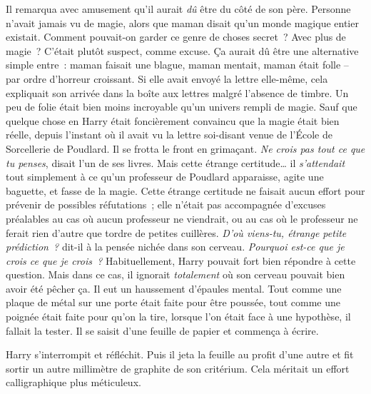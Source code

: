 Il remarqua avec amusement qu'il aurait \emph{dû} être du côté de son père. Personne n'avait jamais vu de magie, alors que maman disait qu'un monde magique entier existait. Comment pouvait-on garder ce genre de choses secret~? Avec plus de magie~? C'était plutôt suspect, comme excuse.
Ça aurait dû être une alternative simple entre~: maman faisait une blague, maman mentait, maman était folle -- par ordre d'horreur croissant. Si elle avait envoyé la lettre elle-même, cela expliquait son arrivée dans la boîte aux lettres malgré l'absence de timbre. Un peu de folie était bien moins incroyable qu'un univers rempli de magie.
Sauf que quelque chose en Harry était foncièrement convaincu que la magie était bien réelle, depuis l'instant où il avait vu la lettre soi-disant venue de l'École de Sorcellerie de Poudlard.
Il se frotta le front en grimaçant. \emph{Ne crois pas tout ce que tu penses}, disait l'un de ses livres.
Mais cette étrange certitude… il \emph{s'attendait} tout simplement à ce qu'un professeur de Poudlard apparaisse, agite une baguette, et fasse de la magie. Cette étrange certitude ne faisait aucun effort pour prévenir de possibles réfutations~; elle n'était pas accompagnée d'excuses préalables au cas où aucun professeur ne viendrait, ou au cas où le professeur ne ferait rien d'autre que tordre de petites cuillères.
\emph{D'où viens-tu, étrange petite prédiction~?} dit-il à la pensée nichée dans son cerveau. \emph{Pourquoi est-ce que je crois ce que je crois~?}
Habituellement, Harry pouvait fort bien répondre à cette question. Mais dans ce cas, il ignorait \emph{totalement} où son cerveau pouvait bien avoir été pêcher ça.
Il eut un haussement d'épaules mental. Tout comme une plaque de métal sur une porte était faite pour être poussée, tout comme une poignée était faite pour qu'on la tire, lorsque l'on était face à une hypothèse, il fallait la tester.
Il se saisit d'une feuille de papier et commença à écrire.
\begin{writtenNote}
\end{writtenNote}

Harry s'interrompit et réfléchit. Puis il jeta la feuille au profit d'une autre et fit sortir un autre millimètre de graphite de son critérium. Cela méritait un effort calligraphique plus méticuleux.

